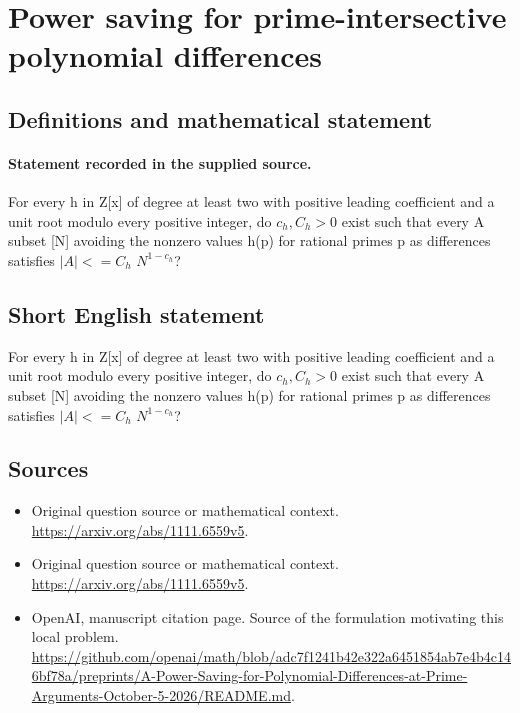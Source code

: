 \documentclass[11pt]{article}
\begin{document}
\section*{Power saving for prime-intersective polynomial differences}\label{30007101}
\subsection{Definitions and mathematical statement}
\paragraph{Statement recorded in the supplied source.}
For every h in Z[x] of degree at least two with positive leading coefficient and a unit root modulo every positive integer, do $c_h,C_h>0$ exist such that every A subset [N] avoiding the nonzero values h(p) for rational primes p as differences satisfies $|A|<=C_h$ $N^{1-c_h}$?
\subsection{Short English statement}
For every h in Z[x] of degree at least two with positive leading coefficient and a unit root modulo every positive integer, do $c_h,C_h>0$ exist such that every A subset [N] avoiding the nonzero values h(p) for rational primes p as differences satisfies $|A|<=C_h$ $N^{1-c_h}$?
\subsection{Sources}
\begin{itemize}
\item[S1] Original question source or mathematical context.
\url{https://arxiv.org/abs/1111.6559v5}.
\item[S2] Original question source or mathematical context.
\url{https://arxiv.org/abs/1111.6559v5}.
\item[S3] OpenAI, manuscript citation page. Source of the formulation motivating this local problem.
\url{https://github.com/openai/math/blob/adc7f1241b42e322a6451854ab7e4b4c146bf78a/preprints/A-Power-Saving-for-Polynomial-Differences-at-Prime-Arguments-October-5-2026/README.md}.
\end{itemize}
\end{document}
